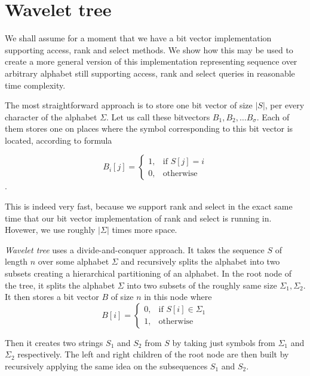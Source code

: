 \section{Wavelet tree}
\label{section:WaweletTree}

We shall assume for a moment that we have a bit vector implementation supporting
access, rank and select methods. We show how this may be used to create
a more general version of this implementation representing sequence over arbitrary
alphabet still supporting access, rank and select queries in reasonable time complexity.

The most straightforward approach is to store one bit vector of size $|S|$,
per every character of the alphabet $\Sigma$. Let us call these bitvectors $B_1,
B_2, \ldots B_{\sigma}$. Each of them stores one on places where the symbol corresponding
to this bit vector is located, according to formula

\[
    B_i[j]= 
\begin{cases}
	1,& \text{if } S[j]=i \\
    0,& \text{otherwise}
\end{cases}
\].

This is indeed very fast, because we support rank and select in the exact same time
that our bit vector implementation of rank and select is running in. Hovewer, we use
roughly $|\Sigma|$ times more space.

\textit{Wavelet tree} uses a divide-and-conquer approach. It takes the sequence $S$ of
length $n$ over some alphabet $\Sigma$ and recursively splits the alphabet into
two subsets creating a hierarchical partitioning of an alphabet. In the root node
of the tree, it splits the alphabet $\Sigma$ into two subsets of the roughly same
size $\Sigma_1, \Sigma_2$. It then stores a bit vector $B$ of size $n$ in this node
where
\[
    B[i]= 
\begin{cases}
    0,& \text{if } S[i]\in \Sigma_1\\
    1,              & \text{otherwise}
\end{cases}
\]

Then it creates two strings $S_1$ and $S_2$ from $S$ by taking just symbols
from $\Sigma_1$ and $\Sigma_2$ respectively. The left and right children of the root node
are then built by recursively applying the same idea on the subsequences $S_1$ and $S_2$.

